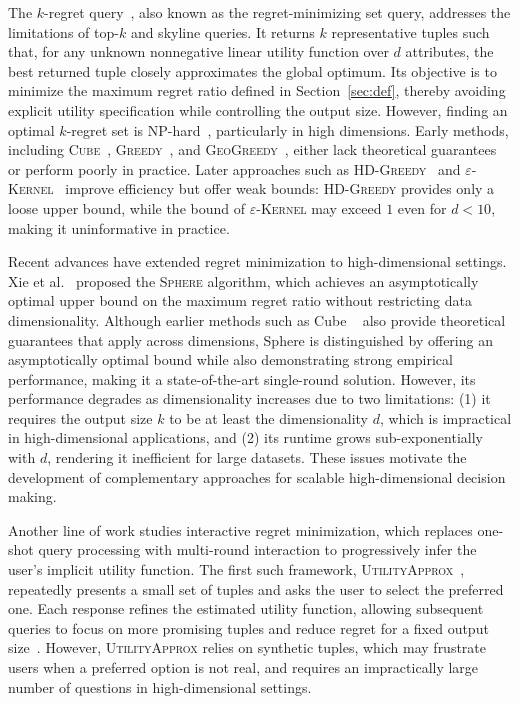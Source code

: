 \documentclass[conference]{IEEEtran}
\theoremstyle{definition}
\theoremstyle{plain}
\begin{document}
The $k$-regret query~\cite{NS10}, also known as the regret-minimizing set query, addresses the limitations of top-$k$ and skyline queries. It returns $k$ representative tuples such that, for any unknown nonnegative linear utility function over $d$ attributes, the best returned tuple closely approximates the global optimum. Its objective is to minimize the maximum regret ratio defined in Section~\ref{sec:def}, thereby avoiding explicit utility specification while controlling the output size. However, finding an optimal $k$-regret set is NP-hard~\cite{AK17, CL17, CT14}, particularly in high dimensions. Early methods, including \textsc{Cube}~\cite{NS10}, \textsc{Greedy}~\cite{NS10}, and \textsc{GeoGreedy}~\cite{PW14}, either lack theoretical guarantees or perform poorly in practice. Later approaches such as \textsc{HD-Greedy}~\cite{asudeh2017efficient} and $\varepsilon$-\textsc{Kernel}~\cite{CL17} improve efficiency but offer weak bounds: \textsc{HD-Greedy} provides only a loose upper bound, while the bound of $\varepsilon$-\textsc{Kernel} may exceed $1$ even for $d<10$, making it uninformative in practice.

Recent advances have extended regret minimization to high-dimensional settings. Xie et al.~\cite{XW18} proposed the \textsc{Sphere} algorithm, which achieves an asymptotically optimal upper bound on the maximum regret ratio without restricting data dimensionality. Although earlier methods such as Cube ~\cite{NS10} also provide theoretical guarantees that apply across dimensions, Sphere is distinguished by offering an asymptotically optimal bound while also demonstrating strong empirical performance, making it a state-of-the-art single-round solution. However, its performance degrades as dimensionality increases due to two limitations: (1) it requires the output size $k$ to be at least the dimensionality $d$, which is impractical in high-dimensional applications, and (2) its runtime grows sub-exponentially with $d$, rendering it inefficient for large datasets. These issues motivate the development of complementary approaches for scalable high-dimensional decision making.

Another line of work studies interactive regret minimization, which replaces one-shot query processing with multi-round interaction to progressively infer the user’s implicit utility function. The first such framework, \textsc{UtilityApprox}~\cite{NL12}, repeatedly presents a small set of tuples and asks the user to select the preferred one. Each response refines the estimated utility function, allowing subsequent queries to focus on more promising tuples and reduce regret for a fixed output size~\cite{NL12}. However, \textsc{UtilityApprox} relies on synthetic tuples, which may frustrate users when a preferred option is not real, and requires an impractically large number of questions in high-dimensional settings.
\end{document}
